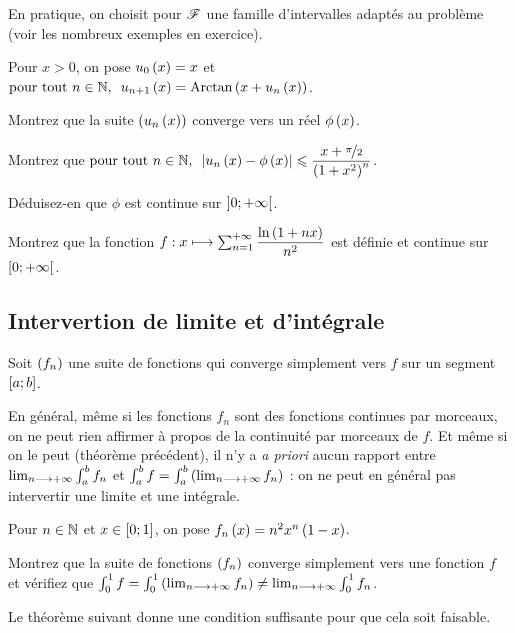 En pratique, on choisit pour \(\mathscr{F}\) une famille d'intervalles adaptés au problème (voir les nombreux exemples en exercice).

\begin{exo}
Pour \(x>0\), on pose \(u_0\left(x\right)=x\) et \(\quantifs{\tpt n\in\N}u_{n+1}\paren{x}=\Arctan\paren{x+u_n\paren{x}}\).

Montrez que la suite \(\left(u_n\left(x\right)\right)\) converge vers un réel \(\phi\left(x\right)\).

Montrez que \(\quantifs{\tpt n\in\N}\abs{u_n\paren{x}-\phi\paren{x}}\leq\dfrac{x+\nicefrac{\pi}{2}}{\paren{1+x^2}^n}\).

Déduisez-en que \(\phi\) est continue sur \(\left]0;+\infty\right[\).
\end{exo}

\begin{exo}
Montrez que la fonction \(f:x\longmapsto\sum_{n=1}^{+\infty}\dfrac{\ln\left(1+nx\right)}{n^2}\) est définie et continue sur \(\left[0;+\infty\right[\).
\end{exo}

\subsection{Intervertion de limite et d'intégrale}

Soit \(\left(f_n\right)\) une suite de fonctions qui converge simplement vers \(f\) sur un segment \(\left[a;b\right]\).

En général, même si les fonctions \(f_n\) sont des fonctions continues par morceaux, on ne peut rien affirmer à propos de la continuité par morceaux de \(f\). Et même si on le peut (\cf théorème précédent), il n'y a \textit{a priori} aucun rapport entre \(\lim_{n\longrightarrow+\infty}\int_a^bf_n\) et \(\int_a^bf=\int_a^b\left(\lim_{n\longrightarrow+\infty}f_n\right)\) : on ne peut en général pas intervertir une limite et une intégrale.

\begin{exo}
Pour \(n\in\mathbb{N}\) et \(x\in\left[0;1\right]\), on pose \(f_n\left(x\right)=n^2x^n\left(1-x\right)\).

Montrez que la suite de fonctions \(\left(f_n\right)\) converge simplement vers une fonction \(f\) et vérifiez que \(\int_0^1f=\int_0^1\left(\lim_{n\longrightarrow+\infty}f_n\right)\not=\lim_{n\longrightarrow+\infty}\int_0^1f_n\).
\end{exo}

Le théorème suivant donne une condition suffisante pour que cela soit faisable.

